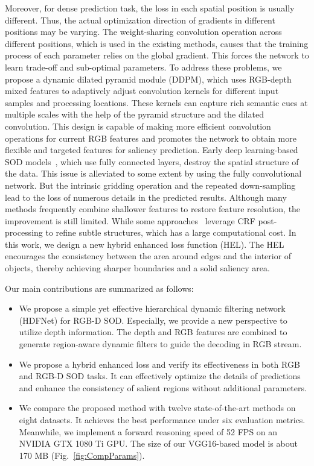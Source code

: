\documentclass[runningheads]{llncs}
\begin{document}
Moreover, for dense prediction task, the loss in each spatial position is usually different.
Thus, the actual optimization direction of gradients in different positions may be varying.
The weight-sharing convolution operation across different positions, which is used in the existing methods, causes that the training process of each parameter relies on the global gradient.
This forces the network to learn trade-off and sub-optimal parameters.
To address these problems, we propose a dynamic dilated pyramid module (DDPM), which uses RGB-depth mixed features to adaptively adjust convolution kernels for different input samples and processing locations.
These kernels can capture rich semantic cues at multiple scales with the help of the pyramid structure and the dilated convolution.
This design is capable of making more efficient convolution operations for current RGB features and promotes the network to obtain more flexible and targeted features for saliency prediction.
Early deep learning-based SOD models~\cite{CTMF}, which use fully connected layers, destroy the spatial structure of the data. This issue is alleviated to some extent by using the fully convolutional network. But the intrinsic gridding operation and the repeated down-sampling lead to the loss of numerous details in the predicted results. Although many methods frequently combine shallower features to restore feature resolution, the improvement is still limited. While some approaches~\cite{DSS,R3Net} leverage CRF post-processing to refine subtle structures, which has a large computational cost. In this work, we design a new hybrid enhanced loss function (HEL). The HEL encourages the consistency between the area around edges and the interior of objects, thereby achieving sharper boundaries and a solid saliency area.

Our main contributions are summarized as follows:

\begin{itemize}[noitemsep, nolistsep]
 \item We propose a simple yet effective hierarchical dynamic filtering network (HDFNet) for RGB-D SOD. Especially, we provide a new perspective to utilize depth information. The depth and RGB features are combined to generate region-aware dynamic filters to guide the decoding in RGB stream.
 \item We propose a hybrid enhanced loss and verify its effectiveness in both RGB and RGB-D SOD tasks. It can effectively optimize the details of predictions and enhance the consistency of salient regions without additional parameters.
 \item We compare the proposed method with twelve state-of-the-art methods on eight datasets. It achieves the best performance under six evaluation metrics. Meanwhile, we implement a forward reasoning speed of 52 FPS on an NVIDIA GTX 1080 Ti GPU. The size of our VGG16-based model is about 170 MB (Fig.~\ref{fig:CompParams}).
\end{itemize}
\end{document}
